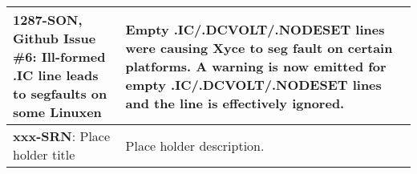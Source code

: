 {\begin{longtable}[h] {>{\raggedright\small}m{2in}|>{\raggedright\let\\\tabularnewline\small}m{3.5in}}
\textbf{1287-SON, Github Issue \#6}: Ill-formed .IC line leads to segfaults on some Linuxen
& Empty .IC/.DCVOLT/.NODESET lines were causing Xyce to seg fault on certain platforms.
A warning is now emitted for empty .IC/.DCVOLT/.NODESET lines and the line is effectively ignored.
\\ \hline

\textbf{xxx-SRN}: Place holder title &
Place holder description.  \\ \hline
\end{longtable}
}
